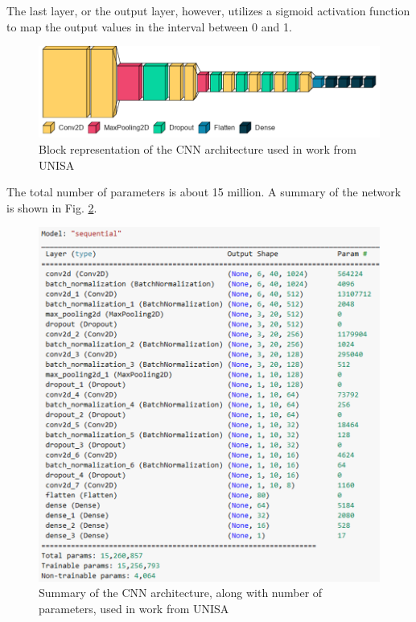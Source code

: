 The last layer, or the output layer, however, utilizes a sigmoid activation function to map the output values in the interval between 0 and 1.

\begin{figure}[ht]
    \centering
    \includegraphics[width=1.0\textwidth]{images/State-of-art/cnn-unisa-architecture.png}
    \caption{Block representation of the CNN architecture used in work from \gls{UNISA}}
    \label{fig:cnn-unisa-architecture}
\end{figure}

The total number of parameters is about 15 million. A summary of the network is shown in Fig. \ref{fig:cnn-unisa-summary}.

\begin{figure}[ht]
    \centering
    \includegraphics[width=1.0\textwidth]{images/State-of-art/cnn-unisa-summary.png}
    \caption{Summary of the CNN architecture, along with number of parameters, used in work from \gls{UNISA}}
    \label{fig:cnn-unisa-summary}
\end{figure}

